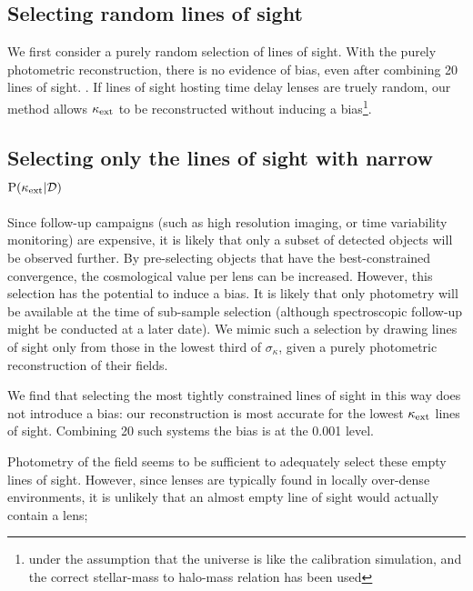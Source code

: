\documentclass[useAMS,usenatbib,a4paper]{mn2e}
\begin{document}

\subsection{Selecting random lines of sight}
\label{sec:bias:random}

We first consider a purely random selection of lines of sight. With the purely
photometric reconstruction, there is no evidence of bias, even after combining
20 lines of sight. . If lines of sight hosting time delay lenses
are truely random,  our method allows $\kappa_{\rm ext}$ to be reconstructed without inducing a bias\footnote{under the assumption that the universe is like the calibration simulation, and the correct stellar-mass to halo-mass relation has been used}. 



\subsection{Selecting only the lines of sight with narrow ${\rm P}(\kappa_{\rm ext}|{\mathcal{D}})$}
\label{sec:bias:tightPDF}

Since follow-up campaigns (such as high resolution imaging, or time
variability monitoring) are expensive, it is likely that only a subset of
detected objects will be observed further. By pre-selecting objects that have 
the best-constrained convergence, the cosmological value per lens can be
increased. However, this selection 
has the potential to induce a bias. It is
likely that only photometry will be available at the time of sub-sample
selection (although spectroscopic follow-up might be conducted at a later
date). We mimic such a selection by drawing lines of sight only from those in
the lowest third of $\sigma_{\kappa}$, given a purely photometric
reconstruction of their fields. 

We find that selecting the most tightly constrained lines of sight in this way
does not introduce a bias: 
our reconstruction is most accurate for the lowest
$\kappa_{\rm ext}$ lines of sight. Combining 20 such systems the bias is at the 0.001 level.

Photometry of the field seems to be sufficient to adequately select these
empty lines of sight.  However, 
since lenses are typically found in locally over-dense
environments, it is unlikely that  an almost empty line of sight would
actually  contain a lens; 
\end{document}
